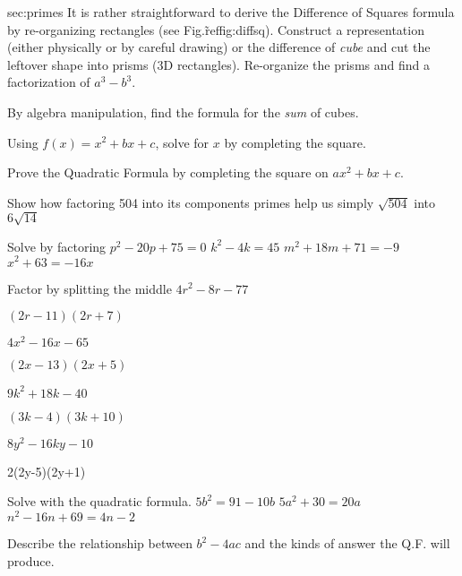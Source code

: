 
\begin{exercises}{sec:primes}
\prob[AA06CubeDifference] It is rather straightforward to derive the Difference of Squares formula by re-organizing rectangles (see Fig.\~ref{fig:diffsq}).  Construct a representation (either physically or by careful drawing) or the difference of \emph{cube} and cut the leftover shape into prisms (3D rectangles).  Re-organize the prisms and find a factorization of $a^3-b^3$.

\prob[AA06CubeSum] By algebra manipulation, find the formula for the \emph{sum} of cubes.

\prob[AA06CS] Using $f(x) = x^2 + bx + c$, solve for $x$ by completing the square.

\prob[AA06QF] Prove the Quadratic Formula by completing the square on $ax^2+bx+c$.

\prob[AA06Root] Show how  factoring 504 into its components primes help us simply $\sqrt{504}$ into $6\sqrt{14}$

\prob[AA06Factor]  Solve by factoring
\subprob $p^2-20p+75=0$
\subprob $k^2-4k=45$
\subprob $m^2+18m+71=-9$
\subprob $x^2+63=-16x$

\prob[AA06Split]  Factor by splitting the middle
\subprob $4r^2-8r-77$
\begin{answer}
$(2r-11)(2r+7)$
\end{answer}
\subprob $4x^2-16x-65$
\begin{answer}
$(2x-13)(2x+5)$
\end{answer}
\subprob $9k^2+18k-40$
\begin{answer}
$(3k-4)(3k+10)$
\end{answer}
\subprob $8y^2-16ky-10$
\begin{answer}
2(2y-5)(2y+1)
\end{answer}

\prob[AA06QF] Solve with the quadratic formula.  
\subprob $5b^2=91-10b$
\subprob $5a^2+30=20a$
\subprob $n^2-16n+69=4n-2$

\prob[AA06Disc]  Describe the relationship between $b^2-4ac$ and the kinds of answer the Q.F. will produce.

\end{exercises}